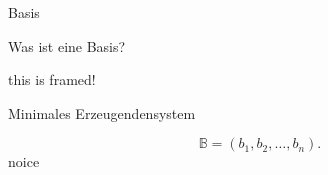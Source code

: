 \documentclass[class=article, crop=false]{standalone}
\begin{document}
\begin{zettel}{Basis}
\begin{flashcard}
\begin{question}
Was ist eine Basis?
\end{question}

\begin{mdframed}
    this is framed!
\end{mdframed}
    Minimales Erzeugendensystem
    
\[
    \mathbb{B} = (b_1 , b_2 , \dots , b_n )
.\]
noice
\end{flashcard}
\end{zettel}
\end{document}
